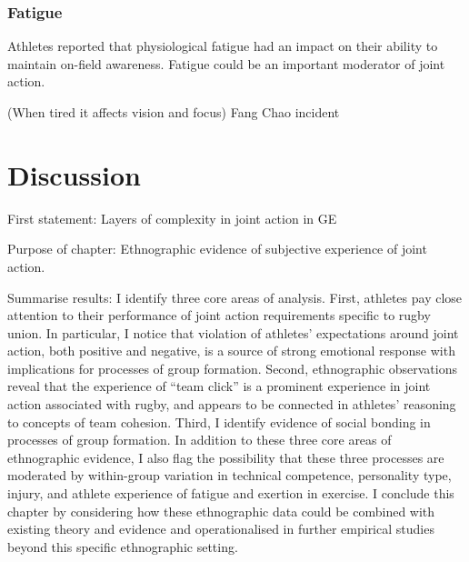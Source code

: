 \begin{CJK}{UTF8}{gbsn}
        \subsubsection{Fatigue}

Athletes reported that physiological fatigue had an impact on their ability to maintain on-field awareness.  Fatigue could be an important moderator of joint action.

(When tired it affects vision and focus)
Fang Chao incident








\section{Discussion}

First statement:
  Layers of complexity in joint action in GE

Purpose of chapter:
  Ethnographic evidence of subjective experience of joint action.




Summarise results:
 I identify three core areas of analysis.  First, athletes pay close attention to their performance of joint action requirements specific to rugby union.  In particular, I notice that violation of athletes' expectations around joint action, both positive and negative, is a source of strong emotional response with implications for processes of group formation.  Second, ethnographic observations reveal that the experience of ``team click'' is a prominent experience in joint action associated with rugby, and appears to be connected in athletes' reasoning to concepts of team cohesion.  Third, I identify evidence of social bonding in processes of group formation.  In addition to these three core areas of ethnographic evidence, I also flag the possibility that these three processes are moderated by within-group variation in technical competence, personality type, injury, and athlete experience of fatigue and exertion in exercise.  I conclude this chapter by considering how these ethnographic data could be combined with existing theory and evidence and operationalised in further empirical studies beyond this specific ethnographic setting.


\end{CJK}
